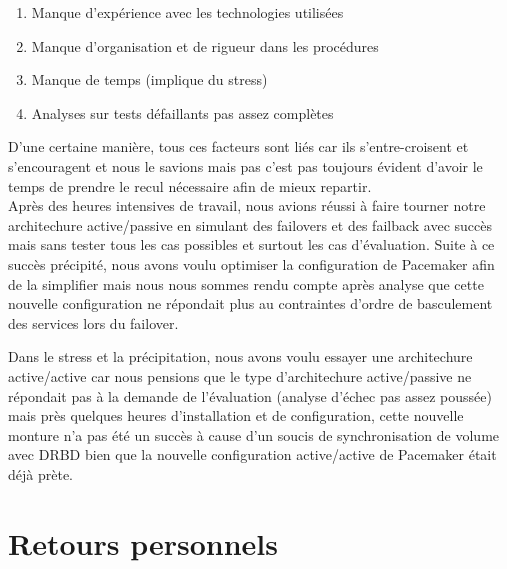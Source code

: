 \documentclass[11pt,a4paper]{report}
\begin{document}
            \begin{enumerate}
                \item Manque d'expérience avec les technologies utilisées
                \item Manque d'organisation et de rigueur dans les procédures
                \item Manque de temps (implique du stress)
                \item Analyses sur tests défaillants pas assez complètes
            \end{enumerate}
            
            D'une certaine manière, tous ces facteurs sont liés car ils s'entre-croisent et s'encouragent et nous le savions mais pas c'est pas toujours évident d'avoir le temps de prendre le recul nécessaire afin de mieux repartir.\\
            
            Après des heures intensives de travail, nous avions réussi à faire tourner notre architechure active/passive en simulant des failovers et des failback avec succès mais sans tester tous les cas possibles et surtout les cas d'évaluation. Suite à ce succès précipité, nous avons voulu optimiser la configuration de Pacemaker afin de la simplifier mais nous nous sommes rendu compte après analyse que cette nouvelle configuration ne répondait plus au contraintes d'ordre de basculement des services lors du failover.
            
            Dans le stress et la précipitation, nous avons voulu essayer une architechure active/active car nous pensions que le type d'architechure active/passive ne répondait pas à la demande de l'évaluation (analyse d'échec pas assez poussée) mais près quelques heures d'installation et de configuration, cette nouvelle monture n'a pas été un succès à cause d'un soucis de synchronisation de volume avec DRBD bien que la nouvelle configuration active/active de Pacemaker était déjà prète.
        
        \section{Retours personnels}
\end{document}
